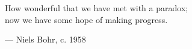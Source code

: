 \begin{flushright}
\begin{hangleftquote}{\QENOpen}{\QENClose}
How wonderful that we have met with a paradox;\\
now we have some hope of making progress.
\end{hangleftquote}
\par\smallskip
\normalfont — Niels Bohr, c. 1958
\end{flushright}
